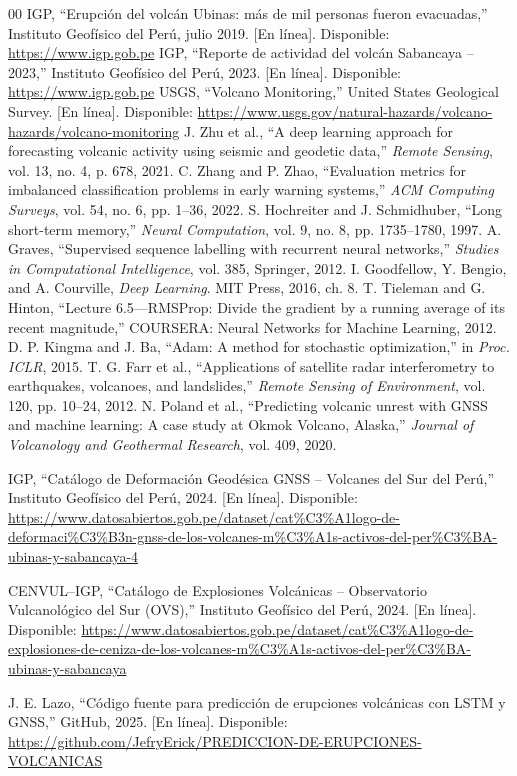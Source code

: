 \documentclass[conference]{IEEEtran}
\begin{document}
\begin{thebibliography}{00}
 IGP, ``Erupción del volcán Ubinas: más de mil personas fueron evacuadas,'' Instituto Geofísico del Perú, julio 2019. [En línea]. Disponible: \url{https://www.igp.gob.pe}
 IGP, ``Reporte de actividad del volcán Sabancaya – 2023,'' Instituto Geofísico del Perú, 2023. [En línea]. Disponible: \url{https://www.igp.gob.pe}
 USGS, ``Volcano Monitoring,'' United States Geological Survey. [En línea]. Disponible: \url{https://www.usgs.gov/natural-hazards/volcano-hazards/volcano-monitoring}
 J. Zhu et al., ``A deep learning approach for forecasting volcanic activity using seismic and geodetic data,'' \emph{Remote Sensing}, vol. 13, no. 4, p. 678, 2021.
 C. Zhang and P. Zhao, ``Evaluation metrics for imbalanced classification problems in early warning systems,'' \emph{ACM Computing Surveys}, vol. 54, no. 6, pp. 1–36, 2022.
 S. Hochreiter and J. Schmidhuber, ``Long short-term memory,'' \emph{Neural Computation}, vol. 9, no. 8, pp. 1735–1780, 1997.
 A. Graves, ``Supervised sequence labelling with recurrent neural networks,'' \emph{Studies in Computational Intelligence}, vol. 385, Springer, 2012.
 I. Goodfellow, Y. Bengio, and A. Courville, \emph{Deep Learning}. MIT Press, 2016, ch. 8.
 T. Tieleman and G. Hinton, ``Lecture 6.5—RMSProp: Divide the gradient by a running average of its recent magnitude,'' COURSERA: Neural Networks for Machine Learning, 2012.
 D. P. Kingma and J. Ba, ``Adam: A method for stochastic optimization,'' in \emph{Proc. ICLR}, 2015.
 T. G. Farr et al., ``Applications of satellite radar interferometry to earthquakes, volcanoes, and landslides,'' \emph{Remote Sensing of Environment}, vol. 120, pp. 10–24, 2012.
 N. Poland et al., ``Predicting volcanic unrest with GNSS and machine learning: A case study at Okmok Volcano, Alaska,'' \emph{Journal of Volcanology and Geothermal Research}, vol. 409, 2020.

 IGP, ``Catálogo de Deformación Geodésica GNSS – Volcanes del Sur del Perú,'' Instituto Geofísico del Perú, 2024. [En línea]. Disponible: \url{https://www.datosabiertos.gob.pe/dataset/cat%C3%A1logo-de-deformaci%C3%B3n-gnss-de-los-volcanes-m%C3%A1s-activos-del-per%C3%BA-ubinas-y-sabancaya-4}

 CENVUL–IGP, ``Catálogo de Explosiones Volcánicas – Observatorio Vulcanológico del Sur (OVS),'' Instituto Geofísico del Perú, 2024. [En línea]. Disponible: \url{https://www.datosabiertos.gob.pe/dataset/cat%C3%A1logo-de-explosiones-de-ceniza-de-los-volcanes-m%C3%A1s-activos-del-per%C3%BA-ubinas-y-sabancaya}

 J. E. Lazo, ``Código fuente para predicción de erupciones volcánicas con LSTM y GNSS,'' GitHub, 2025. [En línea]. Disponible: \url{https://github.com/JefryErick/PREDICCION-DE-ERUPCIONES-VOLCANICAS}

\end{thebibliography}
\end{document}
